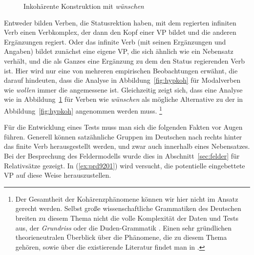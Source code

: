 \begin{figure}[!htbp]
  \caption{Inkohärente Konstruktion mit \textit{wünschen}}
  \label{fig:hypinkoh}
\end{figure}


Entweder bilden Verben, die Statusrektion haben, mit dem regierten infiniten Verb einen Verbkomplex, der dann den Kopf einer VP bildet und die anderen Ergänzungen regiert.
Oder das infinite Verb (mit seinen Ergänzungen und Angaben) bildet zunächst eine eigene VP, die sich ähnlich wie ein Nebensatz verhält, und die als Ganzes eine Ergänzung zu dem den Status regierenden Verb ist.
Hier wird nur eine von mehreren empirischen Beobachtungen erwähnt, die darauf hindeuten, dass die Analyse in Abbildung~\ref{fig:hypkoh} für Modalverben wie \textit{wollen} immer die angemessene ist.
Gleichzeitig zeigt sich, dass eine Analyse wie in Abbildung~\ref{fig:hypinkoh} für Verben wie \textit{wünschen} als mögliche Alternative zu der in Abbildung~\ref{fig:hypkoh} angenommen werden muss.%
\footnote{Der Gesamtheit der Kohärenzphänomene können wir hier nicht im Ansatz gerecht werden.
Selbst große wissenschaftliche Grammatiken des Deutschen breiten zu diesem Thema nicht die volle Komplexität der Daten und Tests aus, \zB der \textit{Grundriss} \citep[359--361]{Eisenberg2} oder die Duden-Grammatik \citep[§1314--§1323]{Duden8}.
Einen sehr gründlichen theorieneutralen Überblick über die Phänomene, die zu diesem Thema gehören, sowie über die existierende Literatur findet man in \citet[253--275]{Mueller08}.
}

Für die Entwicklung eines Tests muss man sich die folgenden Fakten vor Augen führen.
Generell können satzähnliche Gruppen im Deutschen nach rechts hinter das finite Verb herausgestellt werden, und zwar auch innerhalb eines Nebensatzes.
Bei der Besprechung des Feldermodells wurde dies in Abschnitt~\ref{sec:felder} \zB für Relativsätze gezeigt.
In (\ref{ex:prd9201}) wird versucht, die potentielle eingebettete VP auf diese Weise herauszustellen.

